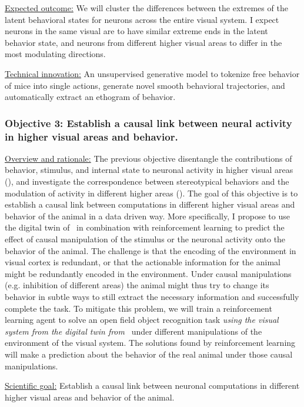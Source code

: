 \documentclass[COG,11pt]{ercgrant}
\begin{document}
\underline{Expected outcome:} 
We will cluster the differences between the extremes of the latent behavioral states for neurons across the entire visual system.
I expect neurons in the same visual are to have similar extreme ends in the latent behavior state, and neurons from different higher visual areas to differ in the most modulating directions. 

\underline{Technical innovation:} 
An unsupervised generative model to tokenize free behavior of mice into single actions, generate novel smooth behavioral trajectories, and automatically extract an ethogram of behavior.

\subsubsection{Objective 3: Establish a causal link between neural activity in higher visual areas and behavior.\hfill{}}
\underline{Overview and rationale:} 
The previous objective disentangle the contributions of behavior, stimulus, and internal state to neuronal activity in higher visual areas (\obji), and investigate the correspondence between stereotypical behaviors and the modulation of activity in different higher areas (\objii). 
The goal of this objective is to establish a causal link between computations in different higher visual areas and behavior of the animal in a data driven way. 
More specifically, I propose to use the digital twin of \obji~in combination with reinforcement learning to predict the effect of causal manipulation of the stimulus or the neuronal activity onto the behavior of the animal. 
The challenge is that the encoding of the environment in visual cortex is redundant, or that the actionable information for the animal might be redundantly encoded in the environment. 
Under causal manipulations (e.g. inhibition of different areas) the animal might thus try to change its behavior in subtle ways to still extract the necessary information and successfully complete the task.
To mitigate this problem, we will train a reinforcement learning agent to solve an open field object recognition task \textit{using the visual system from the digital twin from \obji}~under different manipulations of the environment of the visual system. 
The solutions found by reinforcement learning will make a prediction about the behavior of the real animal under those causal manipulations. 

\underline{Scientific goal:} Establish a causal link between neuronal computations in different higher visual areas and behavior of the animal. 
\end{document}
